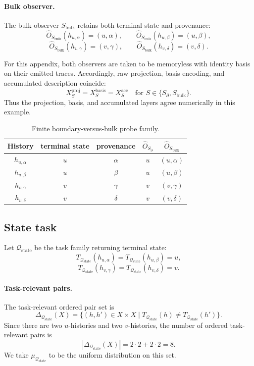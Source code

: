 \documentclass[11pt,twoside]{article}
\newcommand{\TableHeaderRow}{\rowcolor{tableheaderbg}\bfseries}
\theoremstyle{definition}
\newcommand{\proj}{\mathrm{proj}}
\newcommand{\basis}{\mathrm{basis}}
\newcommand{\acc}{\mathrm{acc}}
\newcommand{\bulk}{\mathrm{bulk}}
\begin{document}
\paragraph{Bulk observer.}
The bulk observer \(S_{\bulk}\) retains both terminal state and provenance:
\[
  \widehat{O}_{S_{\bulk}}(h_{u,\alpha})=(u,\alpha),\qquad
  \widehat{O}_{S_{\bulk}}(h_{u,\beta})=(u,\beta),
\]
\[
  \widehat{O}_{S_{\bulk}}(h_{v,\gamma})=(v,\gamma),\qquad
  \widehat{O}_{S_{\bulk}}(h_{v,\delta})=(v,\delta).
\]

For this appendix, both observers are taken to be memoryless with identity basis on their emitted traces. Accordingly, raw projection, basis encoding, and accumulated description coincide:
\[
  X_S^{\proj} = X_S^{\basis} = X_S^{\acc}
  \quad\text{for } S\in\{S_{\partial},S_{\bulk}\}.
\]
Thus the projection, basis, and accumulated layers agree numerically in this example.

\begin{table}[t]
\centering
\begin{tabular}{c c c c c}
\toprule
\TableHeaderRow
History & terminal state & provenance & \(\widehat{O}_{S_{\partial}}\) & \(\widehat{O}_{S_{\bulk}}\) \\
\midrule
\(h_{u,\alpha}\) & \(u\) & \(\alpha\) & \(u\) & \((u,\alpha)\) \\
\(h_{u,\beta}\)  & \(u\) & \(\beta\)  & \(u\) & \((u,\beta)\) \\
\(h_{v,\gamma}\) & \(v\) & \(\gamma\) & \(v\) & \((v,\gamma)\) \\
\(h_{v,\delta}\) & \(v\) & \(\delta\) & \(v\) & \((v,\delta)\) \\
\bottomrule
\end{tabular}
\caption{Finite boundary-versus-bulk probe family.}
\label{tab:boundary-bulk-probe}
\end{table}

\subsection{State task}
\label{app:boundary-bulk-state-task}

Let \(\mathcal{Q}_{\mathrm{state}}\) be the task family returning terminal state:
\[
  T_{\mathcal{Q}_{\mathrm{state}}}(h_{u,\alpha})
  =
  T_{\mathcal{Q}_{\mathrm{state}}}(h_{u,\beta})
  = u,
\]
\[
  T_{\mathcal{Q}_{\mathrm{state}}}(h_{v,\gamma})
  =
  T_{\mathcal{Q}_{\mathrm{state}}}(h_{v,\delta})
  = v.
\]

\paragraph{Task-relevant pairs.}
The task-relevant ordered pair set is
\[
  \Delta_{\mathcal{Q}_{\mathrm{state}}}(X)
  =
  \{
    (h,h')\in X\times X
    \mid
    T_{\mathcal{Q}_{\mathrm{state}}}(h)\neq
    T_{\mathcal{Q}_{\mathrm{state}}}(h')
  \}.
\]
Since there are two \(u\)-histories and two \(v\)-histories, the number of ordered task-relevant pairs is
\[
  |\Delta_{\mathcal{Q}_{\mathrm{state}}}(X)| = 2\cdot 2 + 2\cdot 2 = 8.
\]
We take \(\mu_{\mathcal{Q}_{\mathrm{state}}}\) to be the uniform distribution on this set.
\end{document}
